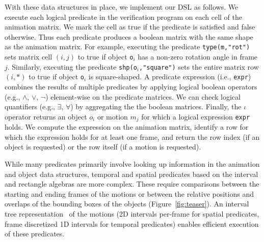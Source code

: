 With these data structures in place, we implement our DSL as follows.
%
%
We execute each logical predicate in the verification program on each
cell of the animation matrix. We mark the
cell as true if the
predicate is satisfied and false otherwise. Thus each predicate
produces a boolean matrix with the same shape as the animation matrix.
%
For example, executing the predicate {\tt type(m,"rot")} sets
matrix cell $(i,j)$ to true if object {\tt o$_i$} has a non-zero rotation
angle in frame $j$. Similarly, executing the predicate {\tt shp(o$_i$,"square")}
sets the entire matrix row $(i,*)$ to true if
object {\tt o$_i$} is square-shaped. 
%
A predicate expression (i.e., {\tt expr}) combines the results of
multiple predicates by applying logical boolean operators (e.g., $\land$,
$\lor$, $\lnot$) element-wise on the predicate matrices.
%
We can check logical quantifiers (e.g., $\exists$, $\forall$) by aggregating
the the boolean matrices.
%
Finally, the $\iota$ operator returns an object $o_i$ or motion $m_j$
for which a logical expression {\tt expr} holds. We compute the
expression on the animation matrix, identify a row for which the
expression holds for at least one frame, and return the row index (if an object
is requested) or the row itself (if a motion is requested).


%

While many predicates primarily involve looking up information in the
animation and object data structures, temporal and spatial predicates
based on the interval and rectangle algebras are more complex.
These require comparisons between the starting and ending frames of
the motions or between the relative positions and overlaps of the
bounding boxes of the objects (Figure~\ref{fig:teaser}).
%
An interval tree representation~\cite{cormen2022introduction} of the
motions (2D intervals per-frame for spatial predicates, frame
discretized 1D intervals for temporal predicates) enables efficient
execution of these predicates.







